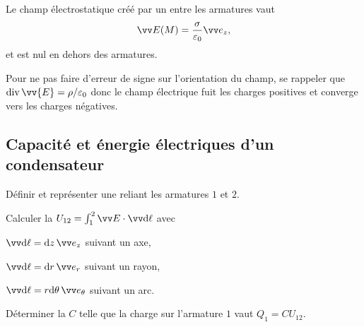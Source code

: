 \documentclass[12pt,fancy]{cours}
\begin{document}
 \begin{prop}\label{prop:}
  Le champ électrostatique créé par un  entre les armatures vaut 
  \begin{equation*}
    \E(M) =  \frac{\sigma}{\varepsilon_0}\ez,
  \end{equation*}
  et est nul en dehors des armatures.
 \end{prop}


\begin{remarque}
 Pour ne pas faire d'erreur de signe sur l'orientation du champ, se rappeler que $\dive{\vv{E}}=\rho/\varepsilon_0$ donc le champ électrique fuit les charges positives et converge vers les charges négatives.
 \end{remarque}
\subsection{Capacité et énergie électriques d'un condensateur}

\begin{methode}
  \item	Définir et représenter une  reliant les armatures $1$ et $2$.
  \item Calculer la  $U_{12} = \int_{1}^{2}\E\cdot\dl$ avec
  \begin{liste}
    \item $\dl = \d z \,\ez$ suivant un axe,
    \item $\dl = \d r \,\er$ suivant un rayon,
    \item $\dl = r \d \theta \,\et$ suivant un arc.
  \end{liste}
  \item Déterminer la  $C$ telle que la charge sur l'armature $1$ vaut $Q_1 = C U_{12}$.
\end{methode}
\end{document}
